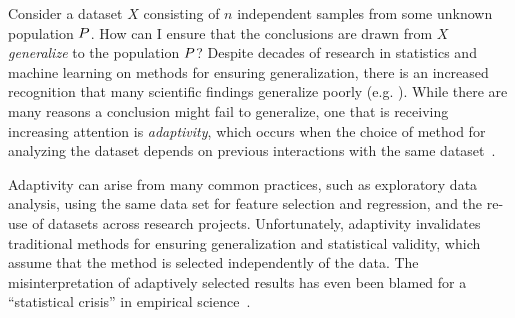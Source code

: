 Consider a dataset $X$ consisting of $n$ independent samples from some unknown population $P$. How can I ensure that the conclusions are drawn from $X$ \emph{generalize} to the population $P$? Despite decades of research in statistics and machine learning on methods for ensuring generalization, there is an increased recognition that many scientific findings generalize poorly (e.g. 
\cite{Ioannidis05,GelmanL13}
). While there are many reasons a conclusion might fail to generalize, one that is receiving increasing attention is \emph{adaptivity}, which occurs when the choice of method for analyzing the dataset depends on previous interactions with the same dataset~\cite{GelmanL13}.

 Adaptivity can arise from many common practices, such as exploratory data analysis, using the same data set for feature selection and regression, and the re-use of datasets across research projects. Unfortunately, adaptivity invalidates traditional methods for ensuring generalization and statistical validity, which assume that the method is selected independently of the data. The misinterpretation of adaptively selected results has even been blamed for a ``statistical crisis'' in empirical science~\cite{GelmanL13}.

